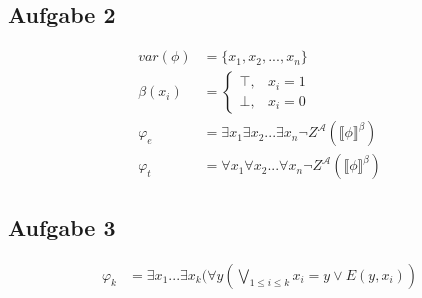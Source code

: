 \documentclass[a4paper,10pt]{article}
\begin{document}
\subsection*{Aufgabe 2}
\begin{align*}
	var(\phi) &= \{x_1,x_2,...,x_n\} \\
	\beta(x_i) &= 
	\begin{cases}
	\top, & x_i = 1 \\
	\bot, & x_i = 0
	\end{cases} \\
	\varphi_e &= \exists x_1 \exists x_2 ...\exists x_n \neg Z^{\mathcal{A}}( \llbracket \phi \rrbracket^{\beta}) \\
	\varphi_t &= \forall x_1 \forall x_2 ...\forall x_n \neg Z^{\mathcal{A}}( \llbracket \phi \rrbracket^{\beta})
\end{align*}

\subsection*{Aufgabe 3}
\begin{align*}
	\varphi_k &= \exists x_1...\exists x_k(\forall y( \bigvee_{1 \le i \le k} x_i = y \lor E(y,x_i))
\end{align*}
\end{document}

